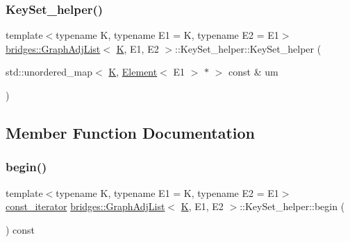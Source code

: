 \subsubsection{\texorpdfstring{KeySet\_helper()}{KeySet\_helper()}}
{\footnotesize\ttfamily template$<$typename K, typename E1 = K, typename E2 = E1$>$ \\
\mbox{\hyperlink{classbridges_1_1_graph_adj_list}{bridges\+::\+Graph\+Adj\+List}}$<$ \mbox{\hyperlink{namespacebridges_acfb0a4f7877d8f63de3e6862004c50edaa5f3c6a11b03839d46af9fb43c97c188}{K}}, E1, E2 $>$\+::Key\+Set\+\_\+helper\+::\+Key\+Set\+\_\+helper (\begin{DoxyParamCaption}\item[{std\+::unordered\+\_\+map$<$ \mbox{\hyperlink{namespacebridges_acfb0a4f7877d8f63de3e6862004c50edaa5f3c6a11b03839d46af9fb43c97c188}{K}}, \mbox{\hyperlink{classbridges_1_1_element}{Element}}$<$ E1 $>$ $\ast$ $>$ const \&}]{um }\end{DoxyParamCaption})\hspace{0.3cm}{\ttfamily [inline]}}



\subsection{Member Function Documentation}
\mbox{\label{classbridges_1_1_graph_adj_list_1_1_key_set__helper_a13d241840008e50b94b3d12fbd897ebd}} 
\subsubsection{\texorpdfstring{begin()}{begin()}}
{\footnotesize\ttfamily template$<$typename K, typename E1 = K, typename E2 = E1$>$ \\
\mbox{\hyperlink{classbridges_1_1_graph_adj_list_1_1_key_set__helper_1_1const__iterator}{const\+\_\+iterator}} \mbox{\hyperlink{classbridges_1_1_graph_adj_list}{bridges\+::\+Graph\+Adj\+List}}$<$ \mbox{\hyperlink{namespacebridges_acfb0a4f7877d8f63de3e6862004c50edaa5f3c6a11b03839d46af9fb43c97c188}{K}}, E1, E2 $>$\+::Key\+Set\+\_\+helper\+::begin (\begin{DoxyParamCaption}{ }\end{DoxyParamCaption}) const\hspace{0.3cm}{\ttfamily [inline]}}

